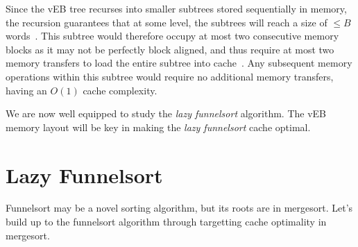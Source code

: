 \documentclass[11pt, letterpaper]{article}
\begin{document}
Since the vEB tree recurses into smaller subtrees stored sequentially in memory, the recursion guarantees that at some level, the subtrees will reach a size of $\le B$ words~\cite{demaine}. This subtree would therefore occupy at most two consecutive memory blocks as it may not be perfectly block aligned, and thus require at most two memory transfers to load the entire subtree into cache~\cite{demaine}. Any subsequent memory operations within this subtree would require no additional memory transfers, having an $O(1)$ cache complexity. 

We are now well equipped to study the \textit{lazy funnelsort} algorithm. The vEB memory layout will be key in making the \textit{lazy funnelsort} cache optimal.

\section{Lazy Funnelsort}

Funnelsort may be a novel sorting algorithm, but its roots are in mergesort. Let's build up to the funnelsort algorithm through targetting cache optimality in mergesort.
\end{document}
